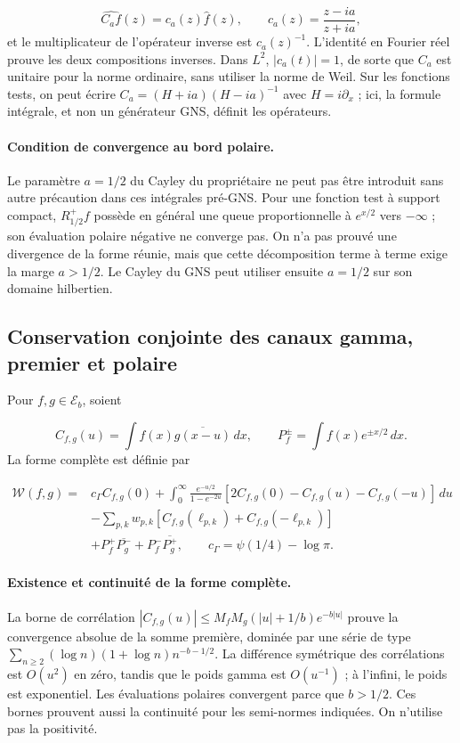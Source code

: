 \[
\widehat{C_af}(z)=c_a(z)\widehat f(z),\qquad
c_a(z)=\frac{z-ia}{z+ia},
\]
et le multiplicateur de l'opérateur inverse est \(c_a(z)^{-1}\). L'identité en Fourier réel prouve les deux compositions inverses. Dans \(L^2\), \(|c_a(t)|=1\), de sorte que \(C_a\) est unitaire pour la norme ordinaire, sans utiliser la norme de Weil. Sur les fonctions tests, on peut écrire \(C_a=(H+ia)(H-ia)^{-1}\) avec \(H=i\partial_x\) ; ici, la formule intégrale, et non un générateur GNS, définit les opérateurs.

\paragraph{Condition de convergence au bord polaire.} Le paramètre \(a=1/2\) du Cayley du propriétaire ne peut pas être introduit sans autre précaution dans ces intégrales pré-GNS. Pour une fonction test à support compact, \(R_{1/2}^+f\) possède en général une queue proportionnelle à \(e^{x/2}\) vers \(-\infty\) ; son évaluation polaire négative ne converge pas. On n'a pas prouvé une divergence de la forme réunie, mais que cette décomposition terme à terme exige la marge \(a>1/2\). Le Cayley du GNS peut utiliser ensuite \(a=1/2\) sur son domaine hilbertien.


\subsection{Conservation conjointe des canaux gamma, premier et polaire}
\label{viii:tm-add-m5}
Pour \(f,g\in\mathscr E_b\), soient

\[
C_{f,g}(u)=\int f(x)\overline{g(x-u)}\,dx,
\qquad P_f^\pm=\int f(x)e^{\pm x/2}\,dx.
\]
La forme complète est définie par

\[
\begin{aligned}
\mathscr W(f,g)={}&c_\Gamma C_{f,g}(0)
+\int_0^\infty\frac{e^{-u/2}}{1-e^{-2u}}
 [2C_{f,g}(0)-C_{f,g}(u)-C_{f,g}(-u)]\,du\\
&-\sum_{p,k}w_{p,k}
 [C_{f,g}(\ell_{p,k})+C_{f,g}(-\ell_{p,k})]\\
&+P_f^+\overline{P_g^-}+P_f^-\overline{P_g^+},
\qquad c_\Gamma=\psi(1/4)-\log\pi.
\end{aligned}
\]
\paragraph{Existence et continuité de la forme complète.} La borne de corrélation \(|C_{f,g}(u)|\le M_fM_g(|u|+1/b)e^{-b|u|}\) prouve la convergence absolue de la somme première, dominée par une série de type \(\sum_{n\ge2}(\log n)(1+\log n)n^{-b-1/2}\). La différence symétrique des corrélations est \(O(u^2)\) en zéro, tandis que le poids gamma est \(O(u^{-1})\) ; à l'infini, le poids est exponentiel. Les évaluations polaires convergent parce que \(b>1/2\). Ces bornes prouvent aussi la continuité pour les semi-normes indiquées. On n'utilise pas la positivité.

